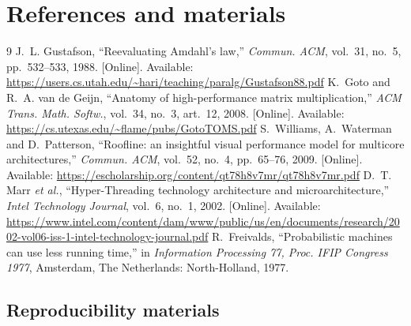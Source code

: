 \documentclass[11pt,a4paper]{article}
\begin{document}
\section{References and materials}


\renewcommand{\refname}{References}
\begingroup
\renewcommand{\section}[2]{}
\begin{thebibliography}{9}\small
{} J.~L. Gustafson, ``Reevaluating Amdahl's law,'' \emph{Commun. ACM}, vol.~31, no.~5, pp.~532--533, 1988. [Online]. Available: \url{https://users.cs.utah.edu/~hari/teaching/paralg/Gustafson88.pdf}
 K.~Goto and R.~A. van de Geijn, ``Anatomy of high-performance matrix multiplication,'' \emph{ACM Trans. Math. Softw.}, vol.~34, no.~3, art.~12, 2008. [Online]. Available: \url{https://cs.utexas.edu/~flame/pubs/GotoTOMS.pdf}
 S.~Williams, A.~Waterman and D.~Patterson, ``Roofline: an insightful visual performance model for multicore architectures,'' \emph{Commun. ACM}, vol.~52, no.~4, pp.~65--76, 2009. [Online]. Available: \url{https://escholarship.org/content/qt78h8v7mr/qt78h8v7mr.pdf}
 D.~T. Marr \emph{et al.}, ``Hyper-Threading technology architecture and microarchitecture,'' \emph{Intel Technology Journal}, vol.~6, no.~1, 2002. [Online]. Available: \url{https://www.intel.com/content/dam/www/public/us/en/documents/research/2002-vol06-iss-1-intel-technology-journal.pdf}
 R.~Freivalds, ``Probabilistic machines can use less running time,'' in \emph{Information Processing 77, Proc. IFIP Congress 1977}, Amsterdam, The Netherlands: North-Holland, 1977.
\end{thebibliography}
\endgroup

\subsection*{Reproducibility materials}
\end{document}
